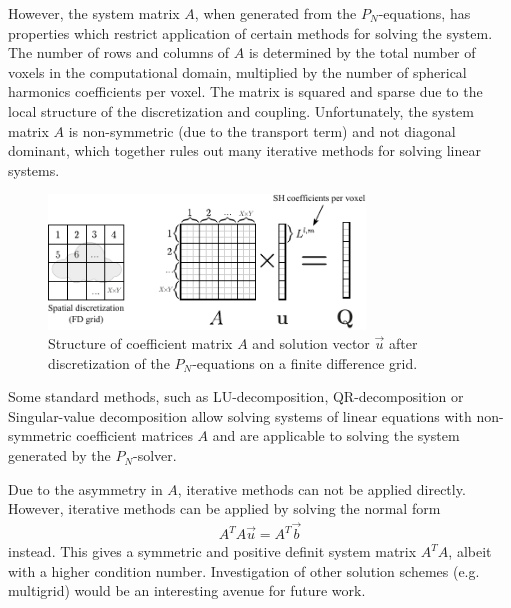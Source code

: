 However, the system matrix $A$, when generated from the $P_N$-equations, has properties which restrict application of certain methods for solving the system. The number of rows and columns of $A$ is determined by the total number of voxels in the computational domain, multiplied by the number of spherical harmonics coefficients per voxel. The matrix is squared and sparse due to the local structure of the discretization and coupling. Unfortunately, the system matrix $A$ is non-symmetric (due to the transport term) and not diagonal dominant, which together rules out many iterative methods for solving linear systems.
\begin{figure}[h]
\centering
\includegraphics[width=0.75\textwidth]{04_pn_method/figures/fig_matrix_layout.pdf}
\caption{Structure of coefficient matrix $A$ and solution vector $\vec{u}$ after discretization of the $P_N$-equations on a finite difference grid.}
\label{fig:pn_matrix_layout}
\end{figure}

Some standard methods, such as LU-decomposition, QR-decomposition or Singular-value decomposition allow solving systems of linear equations with non-symmetric coefficient matrices $A$ and are applicable to solving the system generated by the $P_N$-solver. 

Due to the asymmetry in $A$, iterative methods can not be applied directly. However, iterative methods can be applied by solving the normal form
\begin{align}
A^TA\vec{u} = A^T\vec{b}
\end{align}
instead. This gives a symmetric and positive definit system matrix $A^TA$, albeit with a higher condition number. Investigation of other solution schemes (e.g. multigrid) would be an interesting avenue for future work.

